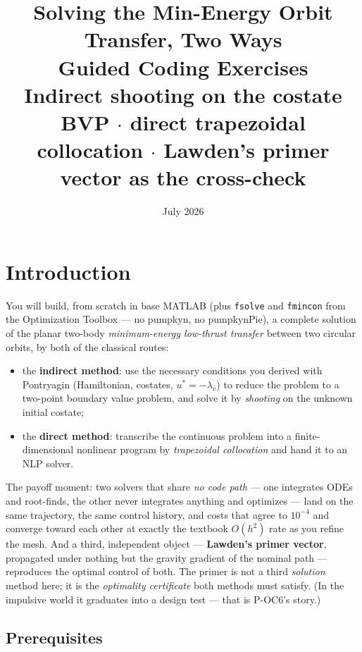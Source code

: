 \documentclass[11pt,letterpaper]{article}
\title{\textbf{Solving the Min-Energy Orbit Transfer, Two Ways}\\[8pt]
\large Guided Coding Exercises\\[4pt]
\normalsize Indirect shooting on the costate BVP \;$\cdot$\; direct trapezoidal
collocation \;$\cdot$\; Lawden's primer vector as the cross-check}
\author{}
\date{July 2026}
\begin{document}
\maketitle
\tableofcontents
\newpage

\section{Introduction}

You will build, from scratch in base MATLAB (plus \texttt{fsolve} and
\texttt{fmincon} from the Optimization Toolbox --- no pumpkyn, no pumpkynPie),
a complete solution of the planar two-body \emph{minimum-energy low-thrust
transfer} between two circular orbits, by both of the classical routes:

\begin{itemize}[leftmargin=*,nosep]
\item the \textbf{indirect method}: use the necessary conditions you derived
  with Pontryagin (Hamiltonian, costates, $u^* = -\lambda_v$) to reduce the
  problem to a two-point boundary value problem, and solve it by
  \emph{shooting} on the unknown initial costate;
\item the \textbf{direct method}: transcribe the continuous problem into a
  finite-dimensional nonlinear program by \emph{trapezoidal collocation} and
  hand it to an NLP solver.
\end{itemize}

The payoff moment: two solvers that share \emph{no code path} --- one
integrates ODEs and root-finds, the other never integrates anything and
optimizes --- land on the same trajectory, the same control history, and costs
that agree to $10^{-4}$ and converge toward each other at exactly the
textbook $O(h^2)$ rate as you refine the mesh. And a third, independent
object --- \textbf{Lawden's primer vector}, propagated under nothing but the
gravity gradient of the nominal path --- reproduces the optimal control of
both. The primer is not a third \emph{solution} method here; it is the
\emph{optimality certificate} both methods must satisfy. (In the impulsive
world it graduates into a design test --- that is P-OC6's story.)

\subsection{Prerequisites}
\end{document}
